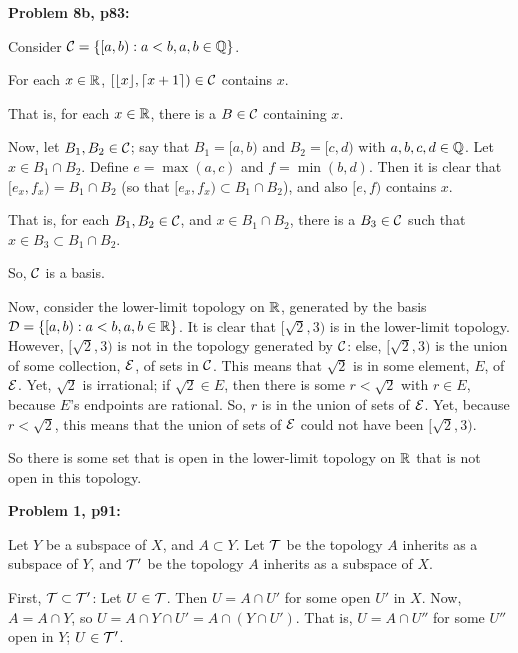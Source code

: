 \documentclass[a4paper,12pt]{article}
\begin{document}
\shunt

{\bf Problem 8b, p83:}

Consider $\mathcal{C} = \{[a,b): a<b, a, b \in \mathbb{Q}\}$.

For each $x \in \mathbb{R}$, $[\lfloor x\rfloor,\lceil x+1\rceil) \in \mathcal{C}$ contains $x$.

That is, for each $x \in \mathbb{R}$, there is a $B \in \mathcal{C}$ containing $x$.

Now, let $B_1, B_2 \in \mathcal{C}$; say that $B_1 = [a,b)$ and $B_2 = [c,d)$ with $a,b,c,d \in \mathbb{Q}$. Let $x \in B_1 \cap B_2$. Define $e = \max(a,c)$ and $f = \min(b,d)$. Then it is clear that $[e_x,f_x) = B_1 \cap B_2$ (so that $[e_x,f_x) \subset B_1 \cap B_2$), and also $[e,f)$ contains $x$. 

That is, for each $B_1, B_2 \in \mathcal{C}$, and  $x \in B_1 \cap B_2$, there is a $B_3 \in \mathcal{C}$ such that $x \in B_3 \subset B_1 \cap B_2$.

So, $\mathcal{C}$ is a basis. 

Now, consider the lower-limit topology on $\mathbb{R}$, generated by the basis $\mathcal{D} = \{[a,b): a<b, a, b \in \mathbb{R}\}$. It is clear that $[\sqrt{2},3)$ is in the lower-limit topology. However, $[\sqrt{2},3)$ is not in the topology generated by $\mathcal{C}$: else, $[\sqrt{2},3)$ is the union of some collection, $\mathcal{E}$, of sets in $\mathcal{C}$. This means that $\sqrt{2}$ is in some element, $E$, of $\mathcal{E}$. Yet, $\sqrt{2}$ is irrational; if $\sqrt{2} \in E$, then there is some $r< \sqrt{2}$ with $r \in E$, because $E$'s endpoints are rational. So, $r$ is in the union of sets of $\mathcal{E}$. Yet, because $r < \sqrt{2}$, this means that the union of sets of $\mathcal{E}$ could not have been $[\sqrt{2},3)$.

So there is some set that is open in the lower-limit topology on $\mathbb{R}$ that is not open in this topology. 


\shunt

{\bf Problem 1, p91:}

Let $Y$ be a subspace of $X$, and $A \subset Y$. Let $\mathcal{T}$ be the topology $A$ inherits as a subspace of $Y$, and $\mathcal{T}'$ be the topology $A$ inherits as a subspace of $X$.

First, $\mathcal{T} \subset \mathcal{T}'$: Let $U \in \mathcal{T}$. Then $U = A \cap U'$ for some open $U'$ in $X$. Now, $A = A \cap Y$, so $U = A \cap Y \cap U' = A \cap (Y \cap U')$. That is, $U = A \cap U''$ for some $U''$ open in $Y$; $U \in \mathcal{T}'$.
\end{document}
